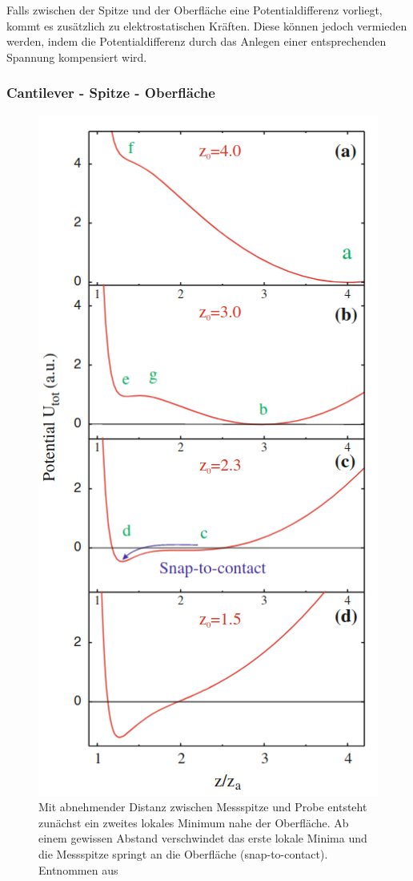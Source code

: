           Falls zwischen der Spitze und der Oberfläche eine Potentialdifferenz vorliegt, kommt es zusätzlich zu elektrostatischen Kräften. Diese können jedoch vermieden werden, indem die Potentialdifferenz durch
          das Anlegen einer entsprechenden Spannung kompensiert wird.\newline
          
        \newpage
        \subsubsection{Cantilever - Spitze - Oberfläche}

          \FloatBarrier

          \begin{figure}
            \includegraphics[scale = 0.45]{pictures/pot_contact.png}
            \caption{Mit abnehmender Distanz zwischen Messspitze und Probe entsteht zunächst ein zweites lokales Minimum nahe der Oberfläche. Ab einem gewissen Abstand verschwindet das erste lokale Minima und die Messspitze springt an die Oberfläche (snap-to-contact). Entnommen aus \cite{voigtlander_scanning_2015}}
            \label{fig:pot_contact}
          \end{figure}

